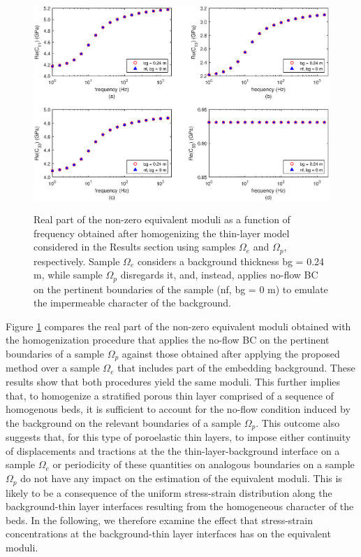 \documentclass[draft]{agujournal2019}
\begin{document}
\begin{figure}[!ht]
\centering
        \includegraphics[width= 120mm, height=80mm]{Figure5.eps}
\caption{Real part of the non-zero equivalent moduli as a function of frequency obtained after homogenizing the thin-layer model considered in the Results section using samples $\Omega_e$ and  $\Omega_p$, respectively. Sample $\Omega_e$ considers a background thickness bg = 0.24 m, while sample $\Omega_p$ disregards it, and, instead, applies no-flow BC on the pertinent boundaries of the sample (nf, bg = 0 m) to emulate the impermeable character of the background.}
\label{fig.5}
\end{figure}

Figure \ref{fig.5} compares the real part of the non-zero equivalent moduli obtained with the homogenization procedure that applies the no-flow BC on the pertinent boundaries of a sample $\Omega_p$ against those obtained after applying the proposed method over a sample $\Omega_e$ that includes part of the embedding background. These results show that both procedures yield the same moduli. This further implies that, to homogenize a stratified porous thin layer comprised of a sequence of homogenous beds, it is sufficient to account for the no-flow condition induced by the background on the relevant boundaries of a sample $\Omega_p$. This outcome also suggests that, for this type of poroelastic thin layers, to impose either continuity of displacements and tractions at the the thin-layer-background interface on a sample $\Omega_e$ or periodicity of these quantities on analogous boundaries on a sample $\Omega_p$ do not have any impact on the estimation of the equivalent moduli.
This is likely to be a consequence of the uniform stress-strain distribution along the background-thin layer interfaces resulting from the homogeneous character of the beds. In the following, we therefore examine the effect that stress-strain concentrations at the background-thin layer interfaces has on the equivalent moduli.
\end{document}
